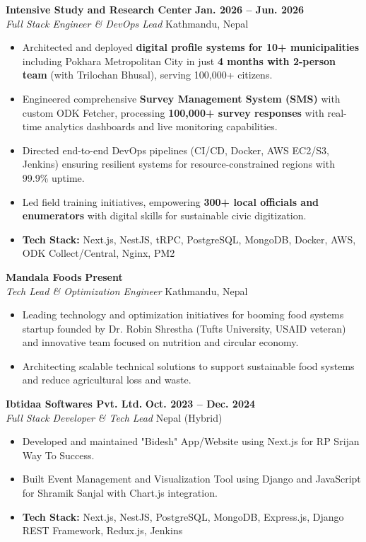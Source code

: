 \documentclass[11pt,a4paper]{article}
\begin{document}
\textbf{Intensive Study and Research Center} \hfill \textbf{Jan. 2026 -- Jun. 2026}\\
\textit{Full Stack Engineer \& DevOps Lead} \hfill Kathmandu, Nepal\\[-6pt]
\begin{itemize}[leftmargin=*, itemsep=2pt, topsep=4pt]
    \item Architected and deployed \textbf{digital profile systems for 10+ municipalities} including Pokhara Metropolitan City in just \textbf{4 months with 2-person team} (with Trilochan Bhusal), serving 100,000+ citizens.
    \item Engineered comprehensive \textbf{Survey Management System (SMS)} with custom ODK Fetcher, processing \textbf{100,000+ survey responses} with real-time analytics dashboards and live monitoring capabilities.
    \item Directed end-to-end DevOps pipelines (CI/CD, Docker, AWS EC2/S3, Jenkins) ensuring resilient systems for resource-constrained regions with 99.9\% uptime.
    \item Led field training initiatives, empowering \textbf{300+ local officials and enumerators} with digital skills for sustainable civic digitization.
    \item \textbf{Tech Stack:} Next.js, NestJS, tRPC, PostgreSQL, MongoDB, Docker, AWS, ODK Collect/Central, Nginx, PM2
\end{itemize}

\textbf{Mandala Foods} \hfill \textbf{Present}\\
\textit{Tech Lead \& Optimization Engineer} \hfill Kathmandu, Nepal\\[-6pt]
\begin{itemize}[leftmargin=*, itemsep=2pt, topsep=4pt]
    \item Leading technology and optimization initiatives for booming food systems startup founded by Dr. Robin Shrestha (Tufts University, USAID veteran) and innovative team focused on nutrition and circular economy.
    \item Architecting scalable technical solutions to support sustainable food systems and reduce agricultural loss and waste.
\end{itemize}

\textbf{Ibtidaa Softwares Pvt. Ltd.} \hfill \textbf{Oct. 2023 -- Dec. 2024}\\
\textit{Full Stack Developer \& Tech Lead} \hfill Nepal (Hybrid)\\[-6pt]
\begin{itemize}[leftmargin=*, itemsep=2pt, topsep=4pt]
    \item Developed and maintained "Bidesh" App/Website using Next.js for RP Srijan Way To Success.
    \item Built Event Management and Visualization Tool using Django and JavaScript for Shramik Sanjal with Chart.js integration.
    \item \textbf{Tech Stack:} Next.js, NestJS, PostgreSQL, MongoDB, Express.js, Django REST Framework, Redux.js, Jenkins
\end{itemize}
\end{document}
